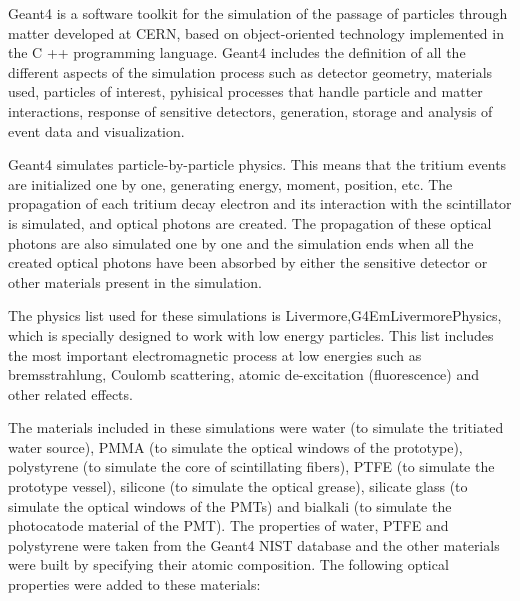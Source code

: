 Geant4 is a software toolkit for the simulation of the passage of particles through matter developed at CERN, based on object-oriented technology implemented in the C ++ programming language. Geant4 includes the definition of all the different aspects of the simulation process such as detector geometry, materials used, particles of interest, pyhisical processes that handle particle and matter interactions, response of sensitive detectors, generation, storage and analysis of event data and visualization.

Geant4 simulates particle-by-particle physics. This means that the tritium events are initialized one by one, generating energy, moment, position, etc. The propagation of each tritium decay electron and its interaction  with the scintillator is simulated, and optical photons are created. The propagation of these optical photons are also simulated one by one and the simulation ends when all the created optical photons have been absorbed by either the sensitive detector or other materials present in the simulation. 

The physics list used for these simulations is Livermore,\newline G4EmLivermorePhysics, which is specially designed to work with low energy particles. This list includes the most important electromagnetic process at low energies such as bremsstrahlung, Coulomb scattering, atomic de-excitation (fluorescence) and other related effects. 

The materials included in these simulations were water (to simulate the tritiated water source), PMMA (to simulate the optical windows of the prototype), polystyrene (to simulate the core of scintillating fibers), PTFE (to simulate the prototype vessel), silicone (to simulate the optical grease), silicate glass (to simulate the optical windows of the PMTs) and bialkali (to simulate the photocatode material of the PMT). The properties of water, PTFE and polystyrene were taken from the Geant4 NIST database and the other materials were built by specifying their atomic composition. The following optical properties were added to these materials:

